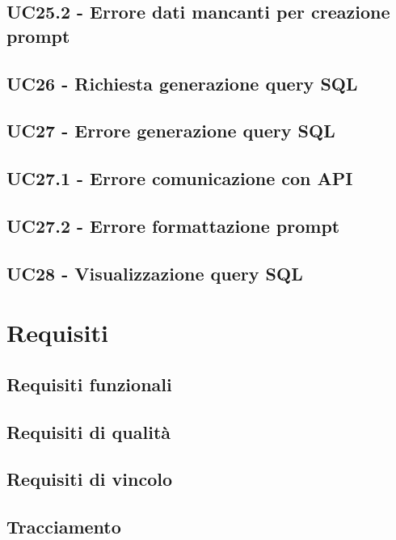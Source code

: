 \documentclass[5pt]{article}
\begin{document}
\subsection{UC25.2 - Errore dati mancanti per creazione prompt}
\label{sec:UC25.2}

\subsection{UC26 - Richiesta generazione query SQL}
\label{sec:UC26}

\subsection{UC27 - Errore generazione query SQL}
\label{sec:UC27}

\subsection{UC27.1 - Errore comunicazione con API}
\label{sec:UC27.1}

\subsection{UC27.2 - Errore formattazione prompt}
\label{sec:UC27.2}

\subsection{UC28 - Visualizzazione query SQL}
\label{sec:UC28}


\fi

\section{Requisiti}
\subsection{Requisiti funzionali}
\subsection{Requisiti di qualità}
\subsection{Requisiti di vincolo}
\subsection{Tracciamento}
\end{document}
